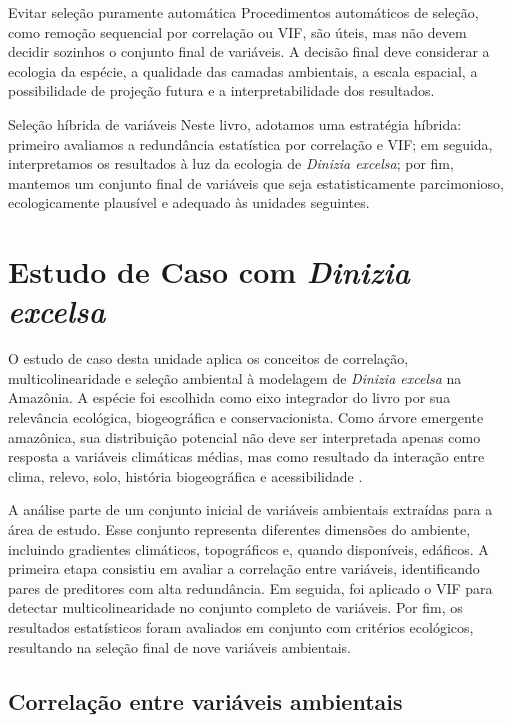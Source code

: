 \begin{caixaatencao}{Evitar seleção puramente automática}
	Procedimentos automáticos de seleção, como remoção sequencial por correlação ou VIF, são úteis, mas não devem decidir sozinhos o conjunto final de variáveis. A decisão final deve considerar a ecologia da espécie, a qualidade das camadas ambientais, a escala espacial, a possibilidade de projeção futura e a interpretabilidade dos resultados.
\end{caixaatencao}

\begin{caixaaplicacao}{Seleção híbrida de variáveis}
	Neste livro, adotamos uma estratégia híbrida: primeiro avaliamos a redundância estatística por correlação e VIF; em seguida, interpretamos os resultados à luz da ecologia de \textit{Dinizia excelsa}; por fim, mantemos um conjunto final de variáveis que seja estatisticamente parcimonioso, ecologicamente plausível e adequado às unidades seguintes.
\end{caixaaplicacao}

\section{Estudo de Caso com \textit{Dinizia excelsa}}

O estudo de caso desta unidade aplica os conceitos de correlação, multicolinearidade e seleção ambiental à modelagem de \textit{Dinizia excelsa} na Amazônia. A espécie foi escolhida como eixo integrador do livro por sua relevância ecológica, biogeográfica e conservacionista. Como árvore emergente amazônica, sua distribuição potencial não deve ser interpretada apenas como resposta a variáveis climáticas médias, mas como resultado da interação entre clima, relevo, solo, história biogeográfica e acessibilidade \parencite{franklin2010mapping,peterson2011ecological}.

A análise parte de um conjunto inicial de variáveis ambientais extraídas para a área de estudo. Esse conjunto representa diferentes dimensões do ambiente, incluindo gradientes climáticos, topográficos e, quando disponíveis, edáficos. A primeira etapa consistiu em avaliar a correlação entre variáveis, identificando pares de preditores com alta redundância. Em seguida, foi aplicado o VIF para detectar multicolinearidade no conjunto completo de variáveis. Por fim, os resultados estatísticos foram avaliados em conjunto com critérios ecológicos, resultando na seleção final de nove variáveis ambientais.

\subsection{Correlação entre variáveis ambientais}

